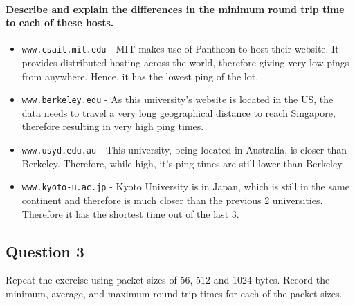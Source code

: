 \documentclass[12pt,a4paper]{article}
\begin{document}
			\paragraph{Describe and explain the differences in the minimum round trip time to each of these hosts.}
			\begin{itemize}
				\item \verb|www.csail.mit.edu| - MIT makes use of Pantheon to host their website. It provides distributed hosting across the world, therefore giving very low pings from anywhere. Hence, it has the lowest ping of the lot. 
				\item \verb|www.berkeley.edu| - As this university's website is located in the US, the data needs to travel a very long geographical distance to reach Singapore, therefore resulting in very high ping times.
				\item \verb|www.usyd.edu.au| - This university, being located in Australia, is closer than Berkeley. Therefore, while high, it's ping times are still lower than Berkeley.
				\item \verb|www.kyoto-u.ac.jp| - Kyoto University is in Japan, which is still in the same continent and therefore is much closer than the previous 2 universities. Therefore it has the shortest time out of the last 3.
			\end{itemize}
		
		\newpage
		
		\subsection{Question 3}
		Repeat the exercise using packet sizes of 56, 512 and 1024 bytes. Record the minimum, average, and maximum round trip times for each of the packet sizes.
	
\end{document}
